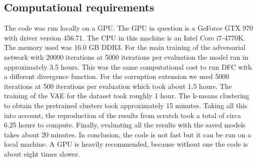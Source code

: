 



\subsection{Computational requirements}

The code was run locally on a GPU. The GPU in question is a GeForce GTX 970 with driver version 456.71. The CPU in this machine is an Intel Core i7-4770K. The memory used was 16.0 GB DDR3. For the main training of the adversarial network with 20000 iterations at 5000 iterations per evaluation the model ran in approximately 3.5 hours. This was the same computational cost to run DFC with a different divergence function. For the corruption extension we used 5000 iterations at 500 iterations per evaluation which took about 1.5 hours. The training of the VAE for the \revMNIST dataset took roughly 1 hour. The k-means clustering to obtain the pretrained clusters took approximately 15 minutes. Taking all this into account, the reproduction of the \revMNIST results from scratch took a total of circa 6.25 hours to compute. Finally, evaluating all the results with the saved models takes about 20 minutes. In conclusion, the code is not fast but it can be run on a local machine. A GPU is heavily recommended, because without one the code is about eight times slower.

